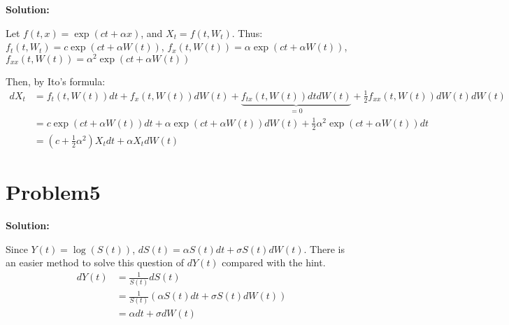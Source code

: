 \documentclass[11pt]{article} %
\begin{document}
\textbf{Solution:}

Let $f(t,x)= \exp(ct+\alpha x)$, and $X_t = f(t,W_t)$. Thus: $f_t(t,W_t) = c\exp (ct+\alpha W(t))$, $f_x(t,W(t))= \alpha \exp(ct+\alpha W(t))$, $f_{xx}(t,W(t))= \alpha^2 \exp(ct+\alpha W(t))$

Then, by Ito's formula:
\begin{align*}
    dX_t &= f_t(t,W(t))dt + f_x(t,W(t))dW(t)+\underbrace{f_{tx}(t,W(t))dtdW(t)}_{=0} +\frac{1}{2}f_{xx}(t,W(t))dW(t)dW(t)\\
        &= c\exp(ct+\alpha W(t))dt+ \alpha \exp(ct+\alpha W(t)) dW(t)+\frac{1}{2}\alpha^2 \exp(ct+\alpha W(t))dt\\
        &= (c+\frac{1}{2}\alpha^2) X_tdt +\alpha X_t dW(t) 
\end{align*}



\section*{Problem5}

\textbf{Solution:}

Since $Y(t) = \log(S(t))$, $dS(t) = \alpha S(t)dt + \sigma S(t) dW(t)$. There is an easier method to solve this question of $dY(t)$ compared with the hint.
\begin{align*}
    dY(t) &= \frac{1}{S(t)} dS(t)\\
        &= \frac{1}{S(t)}(\alpha S(t)dt + \sigma S(t)dW(t))\\
        &= \alpha dt+ \sigma dW(t)
\end{align*}
\end{document}
